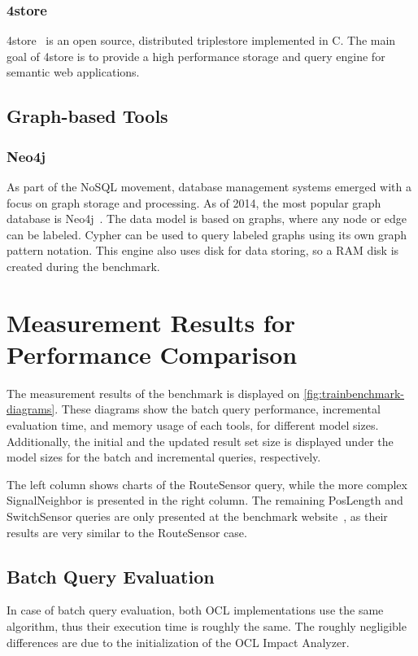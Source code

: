 \subsubsection{4store}
4store~\cite{harris20094store} is an open source, distributed triplestore implemented in C. The main goal of 4store is to provide a high performance storage and query engine for semantic web applications. 

\subsection{Graph-based Tools}

\subsubsection{Neo4j}
As part of the NoSQL movement, database management systems emerged with a focus on graph storage and processing. As of 2014, the most popular graph database is 
Neo4j~\cite{neo4j}. The data model is based on graphs, where any node or edge can be labeled. Cypher can be used to query labeled graphs using its own graph pattern notation. This engine also uses disk for data storing, so a RAM disk is created during the benchmark.

\section{Measurement Results for Performance Comparison}
\label{sec:results}



The measurement results of the benchmark is displayed on
\autoref{fig:trainbenchmark-diagrams}. These diagrams show the batch query
performance, incremental evaluation time, and memory usage of each tools, for
different model sizes. Additionally, the initial and the updated result set size
is displayed under the model sizes for the batch and incremental queries,
respectively.

The left column shows charts of the \textsf{RouteSensor} query,
while the more complex \textsf{SignalNeighbor} is presented in the right column.
The remaining \textsf{PosLength} and \textsf{SwitchSensor} queries are only presented
at the benchmark website~\cite{TBwebsite}, as their results are very similar to the
\textsf{RouteSensor} case.

\subsection{Batch Query Evaluation}
In case of batch query evaluation, both OCL implementations use the same
algorithm, thus their execution time is roughly the same. The roughly negligible
differences are due to the initialization of the OCL Impact Analyzer.

